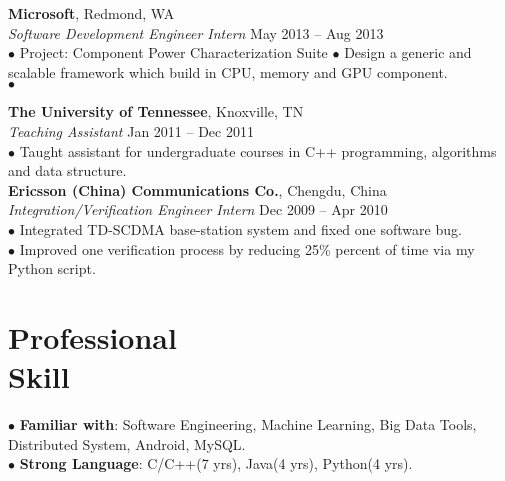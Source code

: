 \documentclass[margin, centered]{resume}
\begin{document}
\begin{resume}
    \textbf{Microsoft}, Redmond, WA \\\vspace{0mm}
    \emph{Software Development Engineer Intern} \hfill May 2013 -- Aug 2013 \vspace{0mm}\\
    $\bullet$ Project: Component Power Characterization Suite
    $\bullet$ Design a generic and scalable framework which build in CPU, memory and GPU component. \vspace{0mm}\\
    $\bullet$ 

    \textbf{The University of Tennessee}, Knoxville, TN \\\vspace{0mm}%
    \emph{Teaching Assistant} \hfill Jan 2011 -- Dec 2011\vspace{0mm}\\
    $\bullet$ Taught assistant for undergraduate courses in C++ programming, algorithms and data structure.\vspace{-6mm}\\
	
    \textbf{Ericsson (China) Communications Co.}, Chengdu, China \vspace{0mm}\\%
	\emph{Integration/Verification Engineer Intern} \hfill Dec 2009 -- Apr 2010\vspace{0mm}\\
    $\bullet$ Integrated TD-SCDMA base-station system and fixed one software bug.\vspace{0mm}\\
    $\bullet$ Improved one verification process by reducing 25\% percent of time via my Python script.\vspace{-5mm}\\

    \section{\mysidestyle Professional \\Skill} 
	
	$\bullet$ \textbf{Familiar with}: Software Engineering, Machine Learning, Big Data Tools, Distributed System, Android, MySQL.\\
    $\bullet$ \textbf{Strong Language}: C/C++(7 yrs), Java(4 yrs), Python(4 yrs).\vspace{-5mm}\\


\end{resume}
\end{document}
